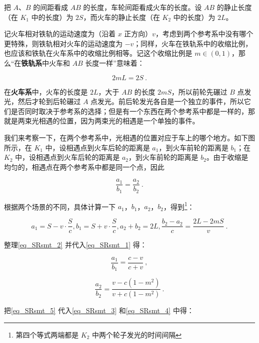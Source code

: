 把 $A$、$B$ 的间距看成 $AB$ 的长度，车轮间距看成火车的长度。设 $AB$ 的静止长度（在 $K_1$ 中的长度）为 $2S$，而火车的静止长度（在 $K_2$ 中的长度）为 $2L$。

记火车相对铁轨的运动速度为（沿着 $x$ 正方向）$v$，考虑到两个参考系中没有哪个更特殊，则铁轨相对火车的运动速度为 $-v$；同样，火车在铁轨系中的收缩比例，也应该和铁轨在火车系中的收缩比例相等。记这个收缩比例是 $m\in(0,1)$，那么“在\textbf{铁轨系}中火车和 $AB$ 长度一样”意味着：

\begin{equation}\label{eq_SRsmt_1}
2mL=2S~.
\end{equation}

在\textbf{火车系}中，火车的长度是 $2L$，大于 $AB$ 的长度 $2mS$，所以前轮先碾过 $B$ 点发光，然后才轮到后轮碾过 $A$ 点发光。前后轮发光各自是一个独立的事件，所以它们是否同时取决于参考系的选择；但是有一个东西在两个参考系中都是一样的，那就是两束光相遇的位置，因为两束光的相遇是一个单独的事件。

我们来考察一下，在两个参考系中，光相遇的位置对应于车上的哪个地方。如下图所示，在 $K_1$ 中，设相遇点到火车后轮的距离是 $a_1$，到火车前轮的距离是 $b_1$；在 $K_2$ 中，设相遇点到火车后轮的距离是 $a_2$，到火车前轮的距离是 $b_2$。由于收缩是均匀的，相遇点在两个参考系中都是同一个点，因此

\begin{equation}\label{eq_SRsmt_5}
\frac{a_1}{b_1}=\frac{a_2}{b_2}~.
\end{equation}

根据两个场景的不同，具体计算一下 $a_1$，$b_1$，$a_2$，$b_2$，得到\footnote{第四个等式两端都是 $K_2$ 中两个轮子发光的时间间隔}：

\begin{equation}\label{eq_SRsmt_2}
a_1=S-v\cdot\frac{S}{c},b_1=S+v\cdot\frac{S}{c},a_2+b_2=2L,\frac{b_2-a_2}{c}=\frac{2L-2mS}{v}~.
\end{equation}

整理\autoref{eq_SRsmt_2} 并代入\autoref{eq_SRsmt_1} 得：

\begin{equation}\label{eq_SRsmt_3}
\frac{a_1}{b_1}=\frac{c-v}{c+v}~,
\end{equation}

\begin{equation}\label{eq_SRsmt_4}
\frac{a_2}{b_2}=\frac{v-c(1-m^2)}{v+c(1-m^2)}~.
\end{equation}

把\autoref{eq_SRsmt_5} 代入\autoref{eq_SRsmt_3} 和\autoref{eq_SRsmt_4} 中得：

